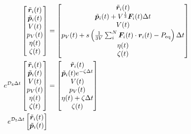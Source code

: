 \begin{align}
\begin{bmatrix}
  \Tilde{\bm{r}}_{i} (t) \\
  \Tilde{\bm{p}}_{i} (t) \\
  V (t) \\
  p_{V} (t) \\
  \eta (t) \\
  \zeta (t) \\
 \end{bmatrix}
 &=
 \begin{bmatrix}
  \Tilde{\bm{r}}_{i} (t) \\
  \Tilde{\bm{p}}_{i} (t) + V^{\frac{1}{3}} \bm{F}_{i} (t) \Delta t \\
  V (t) \\
  p_{V} (t) + s \left( \frac{1}{3V} \sum_{i}^{N}
  \bm{F}_{i}(t) \cdot \bm{r}_{i}(t) - P_{\mathrm{eq}} \right) \Delta t \\
  \eta (t) \\
  \zeta (t) \\
 \end{bmatrix}
 \label{eq:NoseAndersen24.3}
 \\
 e^{\mathcal{D}_{4} \Delta t}
 \begin{bmatrix}
  \Tilde{\bm{r}}_{i} (t) \\
  \Tilde{\bm{p}}_{i} (t) \\
  V (t) \\
  p_{V} (t) \\
  \eta (t) \\
  \zeta (t) \\
 \end{bmatrix}
 &=
 \begin{bmatrix}
  \Tilde{\bm{r}}_{i} (t) \\
  \Tilde{\bm{p}}_{i} (t) e^{- \zeta \Delta t} \\
  V (t) \\
  p_{V} (t) \\
  \eta (t) + \zeta \Delta t\\
  \zeta (t) \\
 \end{bmatrix}
 \label{eq:NoseAndersen24.4}
 \\
 e^{\mathcal{D}_{5} \Delta t}
 \begin{bmatrix}
  \Tilde{\bm{r}}_{i} (t) \\
  \Tilde{\bm{p}}_{i} (t) \\

\end{bmatrix}
\end{align}
